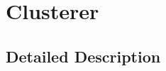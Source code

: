 \hypertarget{group__Clusterer}{}\section{Clusterer}
\label{group__Clusterer}


\subsection{Detailed Description}
